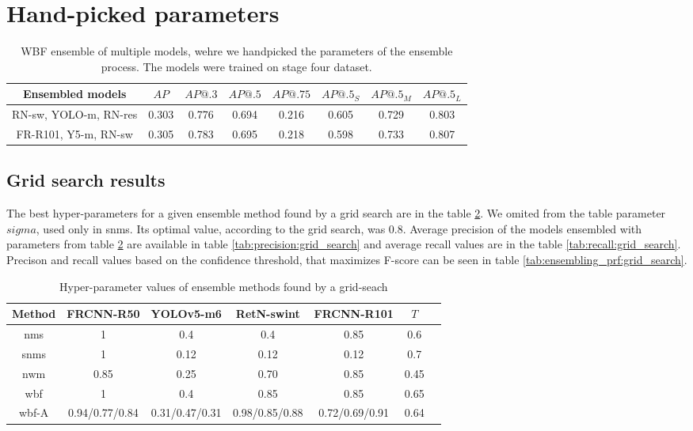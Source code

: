 \section{Hand-picked parameters}
\begin{table}[H]
    \begin{tabular}{|c|c|c|c|c|c|c|c|}
        \hline
        Ensembled models      & $AP$  & $AP@.3$ & $AP@.5$ & $AP@.75$ & $AP@.5_S$ & $AP@.5_M$ & $AP@.5_L$ \\ \hline
        RN-sw, YOLO-m, RN-res & 0.303 & 0.776   & 0.694   & 0.216    & 0.605     & 0.729     & 0.803     \\ \hline
        FR-R101, Y5-m, RN-sw  & 0.305 & 0.783   & 0.695   & 0.218    & 0.598     & 0.733     & 0.807     \\ \hline
    \end{tabular}
    \caption{WBF ensemble of multiple models, wehre we handpicked the parameters of the ensemble process. The models were trained on stage four dataset.}
    \label{tab:model_ensembling:handpicked}
\end{table}
\subsection{Grid search results}
The best hyper-parameters for a given ensemble method found by a grid search are in the table \ref{tab:ensemble_params:grid_search}. We omited from the table parameter $sigma$, used only in snms. Its optimal value, according to the grid search, was $0.8$.
Average precision of the models ensembled with parameters from table \ref{tab:ensemble_params:grid_search} are available in table \ref{tab:precision:grid_search} and average recall values are in the table \ref{tab:recall:grid_search}. Precison and recall values based on the confidence threshold, that maximizes F-score can be seen in table \ref{tab:ensembling_prf:grid_search}.

\begin{table}[H]
    \begin{tabular}{|c|c|c|c|c|c|c|}
        \hline
        Method & FRCNN-R50      & YOLOv5-m6      & RetN-swint     & FRCNN-R101     & $T$  \\ \hline
        nms    & 1              & 0.4            & 0.4            & 0.85           & 0.6  \\ \hline
        snms   & 1              & 0.12           & 0.12           & 0.12           & 0.7  \\ \hline
        nwm    & 0.85           & 0.25           & 0.70           & 0.85           & 0.45 \\ \hline
        wbf    & 1              & 0.4            & 0.85           & 0.85           & 0.65 \\ \hline
        wbf-A  & 0.94/0.77/0.84 & 0.31/0.47/0.31 & 0.98/0.85/0.88 & 0.72/0.69/0.91 & 0.64 \\ \hline
    \end{tabular}
    \caption{Hyper-parameter values of ensemble methods found by a grid-seach}
    \label{tab:ensemble_params:grid_search}
\end{table}


